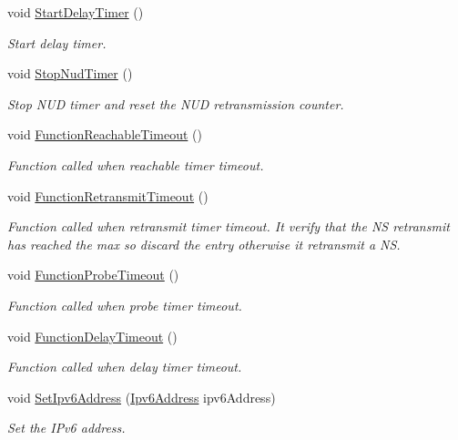 \begin{DoxyCompactItemize}
void \hyperlink{classns3_1_1NdiscCache_1_1Entry_a8716305d5c4e0c94127cd630a692bc4c}{Start\+Delay\+Timer} ()
\begin{DoxyCompactList}\small\item\em Start delay timer. \end{DoxyCompactList}\item 
void \hyperlink{classns3_1_1NdiscCache_1_1Entry_af3a675fe45405d97386ed55e7783b3c8}{Stop\+Nud\+Timer} ()
\begin{DoxyCompactList}\small\item\em Stop N\+UD timer and reset the N\+UD retransmission counter. \end{DoxyCompactList}\item 
void \hyperlink{classns3_1_1NdiscCache_1_1Entry_adf9180123aa433268c0e03485232eee9}{Function\+Reachable\+Timeout} ()
\begin{DoxyCompactList}\small\item\em Function called when reachable timer timeout. \end{DoxyCompactList}\item 
void \hyperlink{classns3_1_1NdiscCache_1_1Entry_ac0d7e00b3243994c379fc0d1e0a34755}{Function\+Retransmit\+Timeout} ()
\begin{DoxyCompactList}\small\item\em Function called when retransmit timer timeout. It verify that the NS retransmit has reached the max so discard the entry otherwise it retransmit a NS. \end{DoxyCompactList}\item 
void \hyperlink{classns3_1_1NdiscCache_1_1Entry_a57edfea5fa7d61054e8b5809145ee59f}{Function\+Probe\+Timeout} ()
\begin{DoxyCompactList}\small\item\em Function called when probe timer timeout. \end{DoxyCompactList}\item 
void \hyperlink{classns3_1_1NdiscCache_1_1Entry_a9658ba137954c9e7f3dae7befed65eb9}{Function\+Delay\+Timeout} ()
\begin{DoxyCompactList}\small\item\em Function called when delay timer timeout. \end{DoxyCompactList}\item 
void \hyperlink{classns3_1_1NdiscCache_1_1Entry_aa730e61cb48f2436667dc89b822337dc}{Set\+Ipv6\+Address} (\hyperlink{classns3_1_1Ipv6Address}{Ipv6\+Address} ipv6\+Address)
\begin{DoxyCompactList}\small\item\em Set the I\+Pv6 address. \end{DoxyCompactList}\end{DoxyCompactItemize}
